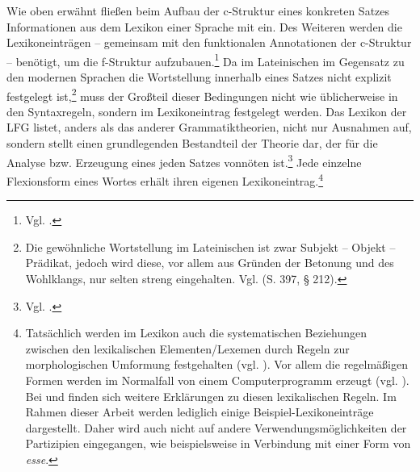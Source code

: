 \documentclass[12pt,a4paper]{article}
\begin{document}
Wie oben erwähnt fließen beim Aufbau der c-Struktur eines konkreten Satzes Informationen aus dem Lexikon einer Sprache mit ein. Des Weiteren werden die Lexikoneinträgen -- gemeinsam mit den funktionalen Annotationen der c-Struktur  -- benötigt, um die f-Struktur aufzubauen.\footnote{Vgl. \cite[63]{Skript}.} Da im Lateinischen im Gegensatz zu den modernen Sprachen die Wortstellung innerhalb eines Satzes nicht explizit festgelegt ist,\footnote{Die gewöhnliche Wortstellung im Lateinischen ist zwar Subjekt – Objekt – Prädikat, jedoch wird diese, vor allem aus Gründen der Betonung und des Wohlklangs, nur selten streng eingehalten. Vgl. \cite[397 §212]{LHS} (S. 397, § 212).} muss der Großteil dieser Bedingungen nicht wie üblicherweise in den Syntaxregeln, sondern im Lexikoneintrag festgelegt werden. Das Lexikon der LFG listet, anders als das anderer Grammatiktheorien, nicht nur Ausnahmen auf, sondern stellt einen grundlegenden Bestandteil der Theorie dar, der für die Analyse bzw. Erzeugung eines jeden Satzes vonnöten ist.\footnote{Vgl. \cite[3]{Dal}.} Jede einzelne Flexionsform eines Wortes erhält ihren eigenen Lexikoneintrag.\footnote{Tatsächlich werden im Lexikon auch die systematischen Beziehungen zwischen den lexikalischen Elementen/Lexemen durch Regeln zur morphologischen Umformung festgehalten (vgl. \cite[3]{Dal}). Vor allem die regelmäßigen Formen werden im Normalfall von einem Computerprogramm erzeugt (vgl. \cite[15]{Rohrer}). Bei \cite[63-76]{Skript} und \cite[20-21]{Rohrer} finden sich weitere Erklärungen zu diesen lexikalischen Regeln. Im Rahmen dieser Arbeit werden lediglich einige Beispiel-Lexikoneinträge dargestellt. Daher wird auch nicht auf andere Verwendungsmöglichkeiten der Partizipien eingegangen, wie beispielsweise in Verbindung mit einer Form von \textit{esse}.}




\end{document}
